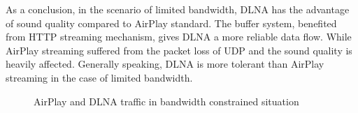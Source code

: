 As a conclusion, in the scenario of limited bandwidth, DLNA has the advantage
of sound quality compared to AirPlay standard. The buffer system, benefited
from HTTP streaming mechanism, gives DLNA a more reliable data flow. While
AirPlay streaming suffered from the packet loss of UDP and the sound quality is
heavily affected. Generally speaking, DLNA is more tolerant than AirPlay
streaming in the case of limited bandwidth. 
\begin{figure}[hb]%
\caption{AirPlay and DLNA traffic in bandwidth constrained
situation\label{all_traffic_bw}}
\end{figure}
